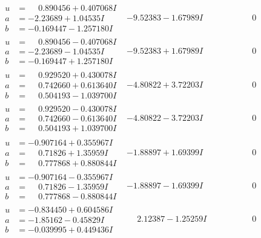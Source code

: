 \documentclass[1p]{elsarticle_modified}
\theoremstyle{definition}
\begin{document}
$$\begin{array}{c|c|c}
\begin{aligned}
u &= \phantom{-}0.890456 + 0.407068 I \\
a &= -2.23689 + 1.04535 I \\
b &= -0.169447 - 1.257180 I\end{aligned}
 & -9.52383 - 1.67989 I & \phantom{-0.000000 } 0 \\ \hline\begin{aligned}
u &= \phantom{-}0.890456 - 0.407068 I \\
a &= -2.23689 - 1.04535 I \\
b &= -0.169447 + 1.257180 I\end{aligned}
 & -9.52383 + 1.67989 I & \phantom{-0.000000 } 0 \\ \hline\begin{aligned}
u &= \phantom{-}0.929520 + 0.430078 I \\
a &= \phantom{-}0.742660 + 0.613640 I \\
b &= \phantom{-}0.504193 - 1.039700 I\end{aligned}
 & -4.80822 + 3.72203 I & \phantom{-0.000000 } 0 \\ \hline\begin{aligned}
u &= \phantom{-}0.929520 - 0.430078 I \\
a &= \phantom{-}0.742660 - 0.613640 I \\
b &= \phantom{-}0.504193 + 1.039700 I\end{aligned}
 & -4.80822 - 3.72203 I & \phantom{-0.000000 } 0 \\ \hline\begin{aligned}
u &= -0.907164 + 0.355967 I \\
a &= \phantom{-}0.71826 + 1.35959 I \\
b &= \phantom{-}0.777868 + 0.880844 I\end{aligned}
 & -1.88897 + 1.69399 I & \phantom{-0.000000 } 0 \\ \hline\begin{aligned}
u &= -0.907164 - 0.355967 I \\
a &= \phantom{-}0.71826 - 1.35959 I \\
b &= \phantom{-}0.777868 - 0.880844 I\end{aligned}
 & -1.88897 - 1.69399 I & \phantom{-0.000000 } 0 \\ \hline\begin{aligned}
u &= -0.834450 + 0.604586 I \\
a &= -1.85162 - 0.45829 I \\
b &= -0.039995 + 0.449436 I\end{aligned}
 & \phantom{-}2.12387 - 1.25259 I & \phantom{-0.000000 } 0 \\ \hline\begin{aligned}

\end{aligned}
\end{array}$$
\end{document}
